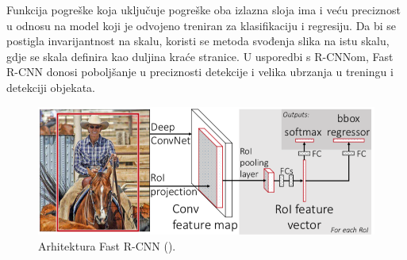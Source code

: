 Funkcija pogreške koja uključuje pogreške oba izlazna sloja ima i veću preciznost u odnosu na model koji je odvojeno treniran za klasifikaciju i regresiju.
Da bi se postigla invarijantnost na skalu, koristi se metoda svođenja slika na istu skalu, gdje se skala definira kao duljina kraće stranice.
U usporedbi s R-CNNom, Fast R-CNN donosi poboljšanje u preciznosti detekcije i velika ubrzanja u treningu i detekciji objekata.

 \begin{figure}
	\centering
	\includegraphics[scale=1]{img/fast_rcnn.png}
	\caption{Arhitektura Fast R-CNN (\cite{DBLP:journals/corr/Girshick15}).}
	\label{fast_rcnn}
\end{figure}